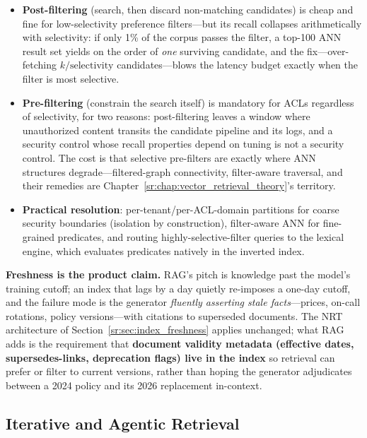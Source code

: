 \begin{itemize}
    \item \textbf{Post-filtering} (search, then discard non-matching candidates) is cheap and fine for low-selectivity preference filters---but its recall collapses arithmetically with selectivity: if only 1\% of the corpus passes the filter, a top-100 ANN result set yields on the order of \textit{one} surviving candidate, and the fix---over-fetching $k/\text{selectivity}$ candidates---blows the latency budget exactly when the filter is most selective.
    \item \textbf{Pre-filtering} (constrain the search itself) is mandatory for ACLs regardless of selectivity, for two reasons: post-filtering leaves a window where unauthorized content transits the candidate pipeline and its logs, and a security control whose recall properties depend on tuning is not a security control. The cost is that selective pre-filters are exactly where ANN structures degrade---filtered-graph connectivity, filter-aware traversal, and their remedies are Chapter~\ref{sr:chap:vector_retrieval_theory}'s territory.
    \item \textbf{Practical resolution}: per-tenant/per-ACL-domain partitions for coarse security boundaries (isolation by construction), filter-aware ANN for fine-grained predicates, and routing highly-selective-filter queries to the lexical engine, which evaluates predicates natively in the inverted index.
\end{itemize}

\textbf{Freshness is the product claim.} RAG's pitch is knowledge past the model's training cutoff; an index that lags by a day quietly re-imposes a one-day cutoff, and the failure mode is the generator \textit{fluently asserting stale facts}---prices, on-call rotations, policy versions---with citations to superseded documents. The NRT architecture of Section~\ref{sr:sec:index_freshness} applies unchanged; what RAG adds is the requirement that \textbf{document validity metadata (effective dates, supersedes-links, deprecation flags) live in the index} so retrieval can prefer or filter to current versions, rather than hoping the generator adjudicates between a 2024 policy and its 2026 replacement in-context.

\subsection{Iterative and Agentic Retrieval}

